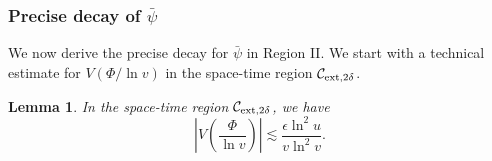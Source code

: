 \documentclass[a4paper,reqno]{amsart}
\newtheorem{lemma}[theorem]{Lemma}
\theoremstyle{definition}
\numberwithin{equation}{section}
\def\ep{\epsilon}
\begin{document}
\subsubsection{Precise decay of $\bar{\psi}$}
We now derive the precise decay for $\bar{\psi}$ in Region II. We start with a technical estimate for $V(\Phi/\ln v)$ in the space-time region $\mathcal{C}_{{\rm{ext}},2\delta}$.



\begin{lemma}\label{le:derivativePhiPsi}
In the space-time region $\mathcal{C}_{{\rm{ext}},2\delta}$, we have
    \begin{equation}\label{est:Secondtech}
\left|V\left(\frac{\Phi}{\ln v}\right)\right|\lesssim \frac{\ep \ln^{2} u}{v\ln^{2}v}.
\end{equation}
\end{lemma}
\end{document}
